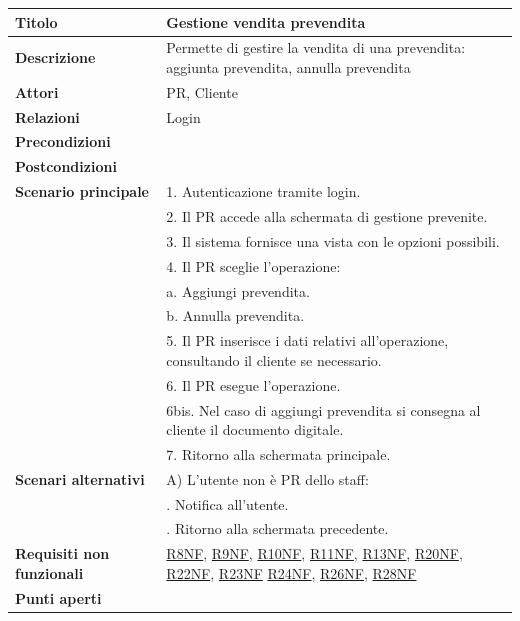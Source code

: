 \documentclass[a4paper]{article}
\begin{document}
  \begin{center}
    \begin{tabularx}{1\textwidth}{l|X}
        \textbf{Titolo} & Gestione vendita prevendita \\
        \hline
        \textbf{Descrizione} & Permette di gestire la vendita di una prevendita: aggiunta prevendita, annulla prevendita \\
        \hline
        \textbf{Attori} & PR, Cliente \\
        \hline
        \textbf{Relazioni} & Login \\
        \hline
        \textbf{Precondizioni} &  \\
        \hline
        \textbf{Postcondizioni} &  \\
        \hline
        \textbf{Scenario principale} & 1. Autenticazione tramite login. \\
                                     & 2. Il PR accede alla schermata di gestione prevenite. \\
                                     & 3. Il sistema fornisce una vista con le opzioni possibili. \\
                                     & 4. Il PR sceglie l'operazione:\\
                                     & \quad a. Aggiungi prevendita.\\
                                     & \quad b. Annulla prevendita.\\
                                     & 5. Il PR inserisce i dati relativi all'operazione, consultando il cliente se necessario.\\
                                     & 6. Il PR esegue l'operazione.\\
                                     & 6bis. Nel caso di aggiungi prevendita si consegna al cliente il documento digitale.\\
                                     & 7. Ritorno alla schermata principale.\\
        \hline
        \textbf{Scenari alternativi} & A) L'utente non è PR dello staff: \\
                                     & \quad 1. Notifica all'utente. \\
                                     & \quad 2. Ritorno alla schermata precedente. \\
        \hline
        \textbf{Requisiti non funzionali} & \hyperlink{R8NF}{R8NF}, \hyperlink{R9NF}{R9NF}, \hyperlink{R10NF}{R10NF}, \hyperlink{R11NF}{R11NF}, \hyperlink{R13NF}{R13NF}, \hyperlink{R20NF}{R20NF}, \hyperlink{R22NF}{R22NF}, \hyperlink{R23NF}{R23NF} \hyperlink{R24NF}{R24NF}, \hyperlink{R26NF}{R26NF}, \hyperlink{R28NF}{R28NF}   \\
        \hline
        \textbf{Punti aperti} & \\
        \hline
    \end{tabularx}
  \end{center}
\end{document}
